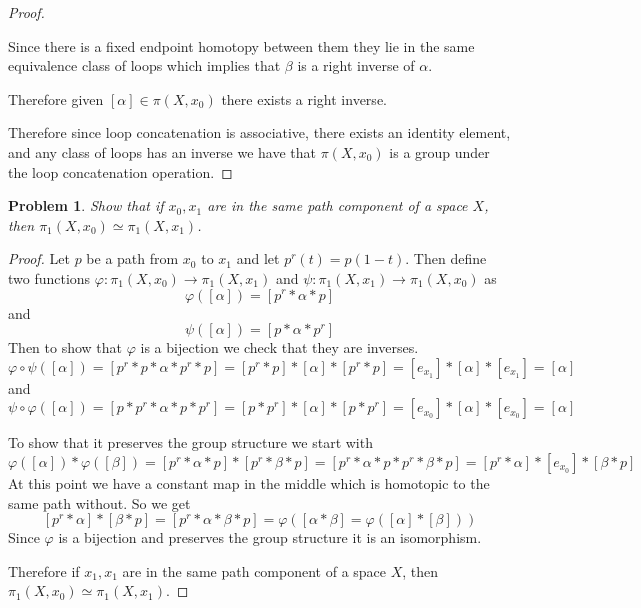 \documentclass[10pt]{article}
\newcommand{\sk}{\vskip 10mm}
\theoremstyle{plain}
\newtheorem{problem}{Problem}
\theoremstyle{remark}
\begin{document}
\begin{proof}
\begin{itemize}
    Since there is a fixed endpoint homotopy between them they lie in the same equivalence
    class of loops which implies that $\beta$ is a right inverse of $\alpha$.

    Therefore given $[\alpha]\in\pi(X,x_0)$ there exists a right inverse.
  \end{itemize}

  Therefore since loop concatenation is associative, there exists an identity element,
  and any class of loops has an inverse we have that $\pi(X,x_0)$ is a group under the
  loop concatenation operation.
\end{proof}

\sk

\begin{problem} %
  Show that if $x_0,x_1$ are in the same path component of a space $X$, then
  $\pi_1(X,x_0)\simeq\pi_1(X,x_1)$.
\end{problem}

\begin{proof}
  Let $p$ be a path from $x_0$ to $x_1$ and let $p^r(t)=p(1-t)$. Then define
  two functions $\varphi:\pi_1(X,x_0)\rightarrow\pi_1(X,x_1)$ and
  $\psi:\pi_1(X,x_1)\rightarrow\pi_1(X,x_0)$ as
  \[ \varphi([\alpha])=[p^r*\alpha*p]\]
  and
  \[ \psi([\alpha])=[p*\alpha*p^r] \]
  Then to show that $\varphi$ is a bijection we check that they are inverses.
  \[ \varphi\circ\psi([\alpha])=[p^r*p*\alpha*p^r*p]=[p^r*p]*[\alpha]*[p^r*p]=
    [e_{x_1}]*[\alpha]*[e_{x_1}]=[\alpha]\]
  and
  \[ \psi\circ\varphi([\alpha])=[p*p^r*\alpha*p*p^r]=[p*p^r]*[\alpha]*[p*p^r]=
    [e_{x_0}]*[\alpha]*[e_{x_0}]=[\alpha]\]

  To show that it preserves the group structure we start with
  \[ \varphi([\alpha])*\varphi([\beta])=[p^r*\alpha*p]*[p^r*\beta*p]=
    [p^r*\alpha*p*p^r*\beta*p]=[p^r*\alpha]*[e_{x_0}]*[\beta*p]\]
  At this point we have a constant map in the middle which is homotopic to the
  same path without. So we get
  \[ [p^r*\alpha]*[\beta*p]=[p^r*\alpha*\beta*p]=\varphi([\alpha*\beta]
    =\varphi([\alpha]*[\beta]))\]
  Since $\varphi$ is a bijection and preserves the group structure it is
  an isomorphism.

  Therefore if $x_1,x_1$ are in the same path component of a space $X$, then
  $\pi_1(X,x_0)\simeq\pi_1(X,x_1)$.
\end{proof}

\sk
\end{document}
